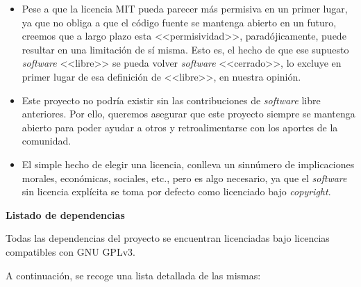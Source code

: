 \vspace{-0.3cm}
\begin{itemize}[\textbullet]
	\item Pese a que la licencia MIT pueda parecer más permisiva en un primer lugar, ya que no obliga a que el código fuente se mantenga abierto en un futuro, creemos que a largo plazo esta <<permisividad>>, paradójicamente, puede resultar en una limitación de sí misma. Esto es, el hecho de que ese supuesto \emph{software} <<libre>> se pueda volver \emph{software} <<cerrado>>, lo excluye en primer lugar de esa definición de <<libre>>, en nuestra opinión.

	\item Este proyecto no podría existir sin las contribuciones de \emph{software} libre anteriores. Por ello, queremos asegurar que este proyecto siempre se mantenga abierto para poder ayudar a otros y retroalimentarse con los aportes de la comunidad.
	
	\item El simple hecho de elegir una licencia, conlleva un sinnúmero de implicaciones morales, económicas, sociales, etc., pero es algo necesario, ya que el \emph{software} sin licencia explícita se toma por defecto como licenciado bajo \emph{copyright}.
\end{itemize}

\newpage

\noindent
\textbf{Listado de dependencias}

Todas las dependencias del proyecto se encuentran licenciadas bajo licencias compatibles con GNU GPLv3.

A continuación, se recoge una lista detallada de las mismas:

